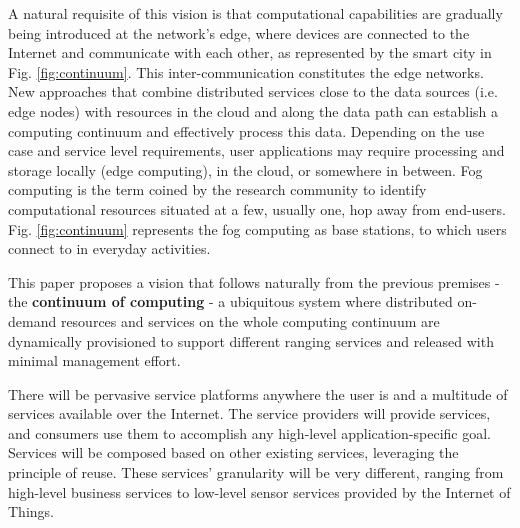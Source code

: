 A natural requisite of this vision is that computational capabilities are gradually being introduced at the network's edge, where devices are connected to the Internet and communicate with each other, as represented by the smart city in Fig. \ref{fig:continuum}. This inter-communication constitutes the edge networks. New approaches that combine distributed services close to the data sources (i.e. edge nodes) with resources in the cloud and along the data path can establish a computing continuum and effectively process this data. Depending on the use case and service level requirements, user applications may require processing and storage locally (edge computing), in the cloud, or somewhere in between. Fog computing \cite{fog-computing} is the term coined by the research community to identify computational resources situated at a few, usually one, hop away from end-users. Fig. \ref{fig:continuum} represents the fog computing as base stations, to which users connect to in everyday activities.


This paper proposes a vision that follows naturally from the previous premises - the \textbf{continuum of computing} - a ubiquitous system where distributed on-demand resources and services on the whole computing continuum are dynamically provisioned to support different ranging services and released with minimal management effort.

There will be pervasive service platforms anywhere the user is and a multitude of services available over the Internet. The service providers will provide services, and consumers use them to accomplish any high-level application-specific goal. Services will be composed based on other existing services, leveraging the principle of reuse. These services' granularity will be very different, ranging from high-level business services to low-level sensor services provided by the Internet of Things.

